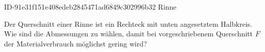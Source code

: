 \begin{exercise}
      {ID-91e31f151e408edeb2845471ad6849c302996b32}
      {Rinne}
  \ifproblem\problem\par
    Der Querschnitt einer Rinne ist ein Rechteck mit unten angesetztem Halbkreis.
    Wie sind die Abmessungen zu wählen, damit bei vorgeschriebenem Querschnitt $F$
    der Materialverbrauch möglichst gering wird?
  \fi
\end{exercise}
